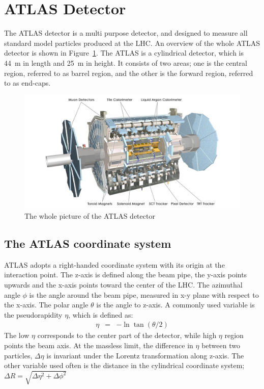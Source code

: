 \section{ATLAS Detector}
\label{sec:detector}
The ATLAS detector is a multi purpose detector, and designed to measure all standard model particles produced at the LHC.
An overview of the whole ATLAS detector is shown in Figure~\ref{fig:ATLAS}.
The ATLAS is a cylindrical detector, which is 44~m in length and 25~m in height. It consists of two areas; one is the central region, referred to as barrel region, and the other is the forward region, referred to as end-caps.
\begin{figure}[tbp]
\begin{center}
 \includegraphics[width=1.0\textwidth,keepaspectratio]{figures/detector/ATLAS}
\caption{
The whole picture of the ATLAS detector
}
\label{fig:ATLAS}
\end{center}
\end{figure}

\subsection{The ATLAS coordinate system}
ATLAS adopts a right-handed coordinate system with its origin at the interaction point. The z-axis is defined along the beam pipe, the y-axis points upwards and the x-axis points toward the center of the LHC. The azimuthal angle $\phi$ is the angle around the beam pipe, measured in x-y plane with respect to the x-axis. The polar angle $\theta$ is the angle to z-axis. A commonly used variable is the pseudorapidity $\eta$, which is defined as:
\begin{eqnarray*}
\eta &=& -\ln\tan(\theta/2)
\end{eqnarray*}
The low $\eta$ corresponds to the center part of the detector, while high $\eta$ region points the beam axis. At the massless limit, the difference in $\eta$ between two particles, $\Delta\eta$ is invariant under the Lorentz transformation along z-axis.
The other variable used often is the distance in the cylindrical coordinate system;
$
\Delta R = \sqrt{\Delta \eta^2 + \Delta \phi^2}
$

